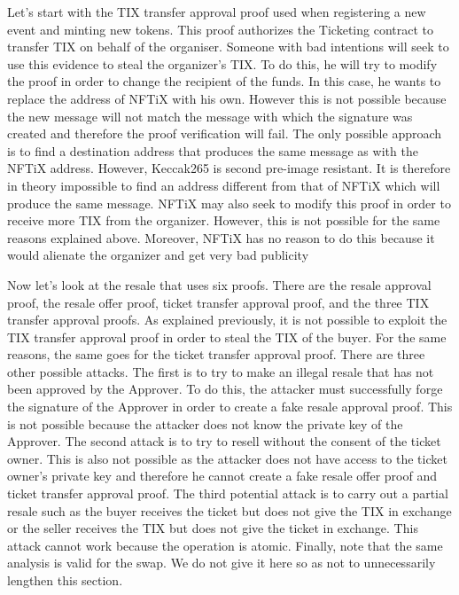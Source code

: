 \documentclass[a4paper,11pt,oneside]{report}
\begin{document}
Let's start with the TIX transfer approval proof used when registering a new event and minting new tokens. This proof authorizes the Ticketing contract to transfer TIX on behalf of the organiser. Someone with bad intentions will seek to use this evidence to steal the organizer's TIX. To do this, he will try to modify the proof in order to change the recipient of the funds. In this case, he wants to replace the address of NFTiX with his own. However this is not possible because the new message will not match the message with which the signature was created and therefore the proof verification will fail. The only possible approach is to find a destination address that produces the same message as with the NFTiX address. However, Keccak265 is second pre-image resistant. It is therefore in theory impossible to find an address different from that of NFTiX which will produce the same message. NFTiX may also seek to modify this proof in order to receive more TIX from the organizer. However, this is not possible for the same reasons explained above. Moreover, NFTiX has no reason to do this because it would alienate the organizer and get very bad publicity 

Now let's look at the resale that uses six proofs. There are the resale approval proof, the resale offer proof, ticket transfer approval proof, and the three TIX transfer approval proofs. As explained previously, it is not possible to exploit the TIX transfer approval proof in order to steal the TIX of the buyer. For the same reasons, the same goes for the ticket transfer approval proof. There are three other possible attacks. The first is to try to make an illegal resale that has not been approved by the Approver. To do this, the attacker must successfully forge the signature of the Approver in order to create a fake resale approval proof. This is not possible because the attacker does not know the private key of the Approver. The second attack is to try to resell without the consent of the ticket owner. This is also not possible as the attacker does not have access to the ticket owner's private key and therefore he cannot create a fake resale offer proof and ticket transfer approval proof. The third potential attack is to carry out a partial resale such as the buyer receives the ticket but does not give the TIX in exchange or the seller receives the TIX but does not give the ticket in exchange. This attack cannot work because the operation is atomic. Finally, note that the same analysis is valid for the swap. We do not give it here so as not to unnecessarily lengthen this section.
\end{document}
